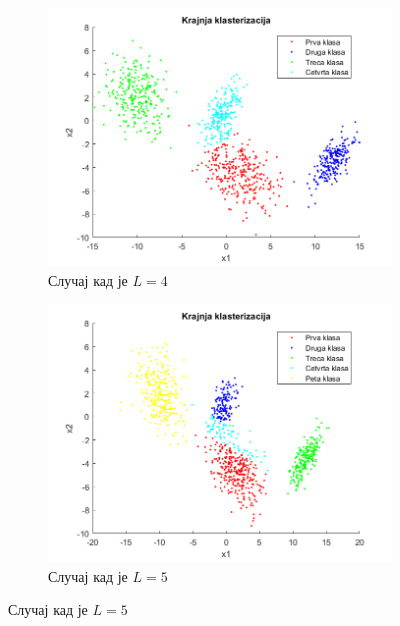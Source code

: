 \begin{figure}[htb!]
\bigskip
\begin{subfigure}{.55\textwidth}
\centering
\includegraphics[width=1\linewidth]{pictures/4/Quad4Final}
\caption{Случај кад је $L=4$}\label{pic:Quad4Final}
\end{subfigure}
\begin{subfigure}{.55\textwidth}
\centering
\includegraphics[width=1\linewidth]{pictures/4/Quad5Final}
\caption{Случај кад је $L=5$}\label{pic:Quad5Final}
\end{subfigure}
\end{figure}


